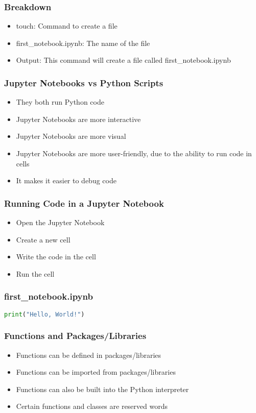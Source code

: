 \documentclass[serif, 9pt, aspectratio=32]{beamer}
\begin{document}
\begin{frame}
    \centering
    \frametitle{Breakdown}
    \begin{itemize}
        \setlength{\itemsep}{3em}
        \item touch: Command to create a file
        \item first\_notebook.ipynb: The name of the file
        \item Output: This command will create a file called first\_notebook.ipynb
    \end{itemize}
\end{frame}

\begin{frame}
    \centering
    \frametitle{Jupyter Notebooks vs Python Scripts}
    \begin{itemize}
        \setlength{\itemsep}{3em}
        \item They both run Python code
        \item Jupyter Notebooks are more interactive
        \item Jupyter Notebooks are more visual
        \item Jupyter Notebooks are more user-friendly, due to the ability to run code in cells
        \item It makes it easier to debug code
    \end{itemize}
\end{frame}

\begin{frame}
    \centering
    \frametitle{Running Code in a Jupyter Notebook}
    \begin{itemize}
        \setlength{\itemsep}{3em}
        \item Open the Jupyter Notebook
        \item Create a new cell
        \item Write the code in the cell
        \item Run the cell
    \end{itemize}
\end{frame}

\begin{frame}[fragile]
    \frametitle{first\_notebook.ipynb}
    \begin{lstlisting}[language=Python]
        print("Hello, World!")
    \end{lstlisting}
\end{frame}

\begin{frame}
    \centering
    \frametitle{Functions and Packages/Libraries}
    \begin{itemize}
        \setlength{\itemsep}{3em}
        \item Functions can be defined in packages/libraries
        \item Functions can be imported from packages/libraries
        \item Functions can also be built into the Python interpreter
        \item Certain functions and classes are reserved words
    \end{itemize}
\end{frame}
\end{document}
